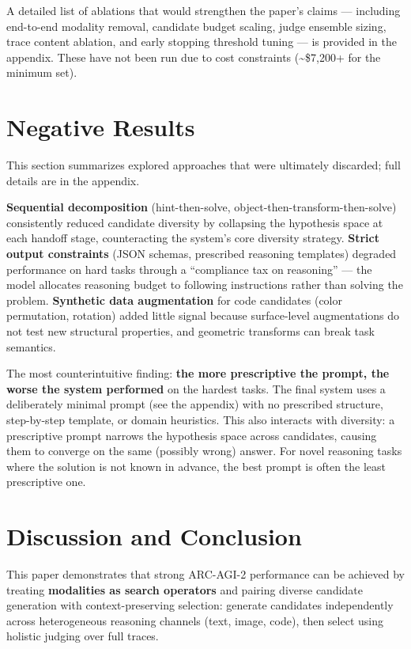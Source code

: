 \documentclass[10pt]{article}
\begin{document}
A detailed list of ablations that would strengthen the paper's claims
--- including end-to-end modality removal, candidate budget scaling,
judge ensemble sizing, trace content ablation, and early stopping
threshold tuning --- is provided in the appendix. These have not been
run due to cost constraints (\textasciitilde\$7,200+ for the minimum
set).

\hypertarget{negative-results}{%
\section{Negative Results}\label{negative-results}}

This section summarizes explored approaches that were ultimately
discarded; full details are in the appendix.

\textbf{Sequential decomposition} (hint-then-solve,
object-then-transform-then-solve) consistently reduced candidate
diversity by collapsing the hypothesis space at each handoff stage,
counteracting the system's core diversity strategy. \textbf{Strict
output constraints} (JSON schemas, prescribed reasoning templates)
degraded performance on hard tasks through a ``compliance tax on
reasoning'' --- the model allocates reasoning budget to following
instructions rather than solving the problem. \textbf{Synthetic data
augmentation} for code candidates (color permutation, rotation) added
little signal because surface-level augmentations do not test new
structural properties, and geometric transforms can break task
semantics.

The most counterintuitive finding: \textbf{the more prescriptive the
prompt, the worse the system performed} on the hardest tasks. The final
system uses a deliberately minimal prompt (see the appendix) with no
prescribed structure, step-by-step template, or domain heuristics. This
also interacts with diversity: a prescriptive prompt narrows the
hypothesis space across candidates, causing them to converge on the same
(possibly wrong) answer. For novel reasoning tasks where the solution is
not known in advance, the best prompt is often the least prescriptive
one.

\hypertarget{discussion-and-conclusion}{%
\section{Discussion and Conclusion}\label{discussion-and-conclusion}}

This paper demonstrates that strong ARC-AGI-2 performance can be
achieved by treating \textbf{modalities as search operators} and pairing
diverse candidate generation with context-preserving selection: generate
candidates independently across heterogeneous reasoning channels (text,
image, code), then select using holistic judging over full traces.
\end{document}
